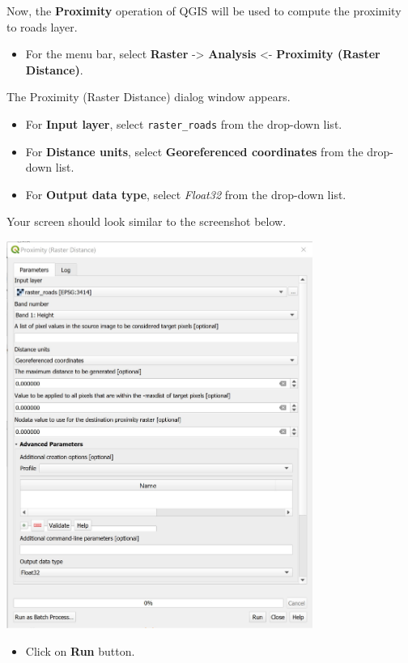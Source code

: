\documentclass[
  letterpaper,
  DIV=11,
  numbers=noendperiod]{scrreprt}
\providecommand{\tightlist}{%
  \setlength{\itemsep}{0pt}\setlength{\parskip}{0pt}}\usepackage{longtable,booktabs,array}
\begin{document}
Now, the \textbf{Proximity} operation of QGIS will be used to compute
the proximity to roads layer.

\begin{itemize}
\tightlist
\item
  For the menu bar, select \textbf{Raster} -\textgreater{}
  \textbf{Analysis} \textless- \textbf{Proximity (Raster Distance)}.
\end{itemize}

The Proximity (Raster Distance) dialog window appears.

\begin{itemize}
\tightlist
\item
  For \textbf{Input layer}, select \texttt{raster\_roads} from the
  drop-down list.
\item
  For \textbf{Distance units}, select \textbf{Georeferenced coordinates}
  from the drop-down list.
\item
  For \textbf{Output data type}, select \emph{Float32} from the
  drop-down list.
\end{itemize}

Your screen should look similar to the screenshot below.

\includegraphics[width=0.75\textwidth,height=\textheight]{./img07/image26.jpg}

\begin{itemize}
\tightlist
\item
  Click on \textbf{Run} button.
\end{itemize}
\end{document}
